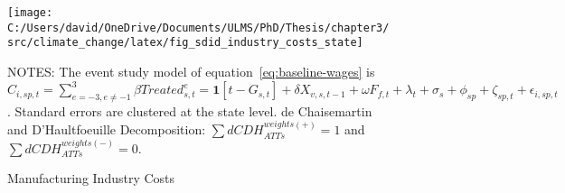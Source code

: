 \begin{figure}[H]
    \centering
    \texttt{[image: C:/Users/david/OneDrive/Documents/ULMS/PhD/Thesis/chapter3/src/climate\_change/latex/fig\_sdid\_industry\_costs\_state]}
    \caption{Manufacturing Industry Costs}
    \label{fig:baseline-manufacturing-industry-costs}
    \begin{minipage}{\columnwidth}
        \vspace{0.05in}
        \tiny NOTES: The event study model of equation~\ref{eq:baseline-wages} is $C_{i,sp,t} = \sum_{{e = -3},{e \neq -1}}^{3} \beta Treated_{s,t}^e = \textbf{1}[t - G_{s,t}] + \delta X_{v,s,t-1} + \omega F_{f,t} + \lambda_{t} + \sigma_{s} + \phi_{sp} + \zeta_{sp,t} + \epsilon_{i,sp,t}$. Standard errors are clustered at the state level. de Chaisemartin and D'Haultfoeuille Decomposition: $\sum dCDH_{ATTs}^{weights(+)} = 1$ and $\sum dCDH_{ATTs}^{weights(-)} = 0$.
    \end{minipage}
\end{figure}